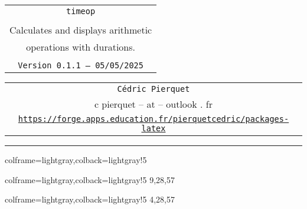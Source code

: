 \documentclass[11pt,a4paper]{ltxdoc}
\def\TPversion{0.1.1}
\def\TPdate{05/05/2025}
\begin{document}
\thispagestyle{empty}

\begin{center}
	\begin{minipage}{0.88\linewidth}
		\begin{tcolorbox}[colframe=yellow,colback=yellow!15]
			\begin{center}
				\renewcommand{\arraystretch}{1.25}%
				\begin{tabular}{c}
					{\Huge \texttt{timeop}}\\
					\\
					{\LARGE Calculates and displays arithmetic} \\
					{\LARGE operations with durations.} \\
					\\
					{\small \texttt{Version \TPversion{} -- \TPdate}}
				\end{tabular}
			\end{center}
		\end{tcolorbox}
	\end{minipage}
\end{center}

\begin{center}
	\begin{tabular}{c}
		\texttt{Cédric Pierquet}\\
		{\ttfamily c pierquet -- at -- outlook . fr}\\
		\texttt{\url{https://forge.apps.education.fr/pierquetcedric/packages-latex}} \\
	\end{tabular}
\end{center}

\hrule

\vfill

\begin{tcblisting}{colframe=lightgray,colback=lightgray!5}
\end{tcblisting}

\begin{tcblisting}{colframe=lightgray,colback=lightgray!5}
%
  {9,28,57}
\end{tcblisting}

\begin{tcblisting}{colframe=lightgray,colback=lightgray!5}
%
  {4,28,57}
\end{tcblisting}

\vfill~
\end{document}
